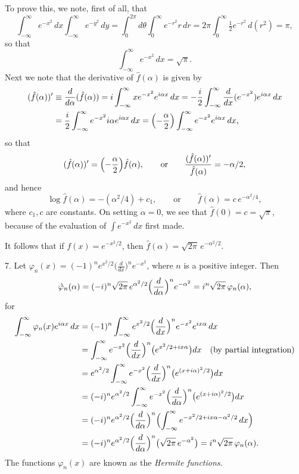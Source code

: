 To prove this, we note, first of all, that
\begin{equation*}
\int_{-\infty}^{\infty}e^{-x^2}\,dx\int_{-\infty}^{\infty}e^{-y^2}\,dy
=\int_0^{2\pi}d\theta\int_0^\infty e^{-r^2}r\,dr
=2\pi\int_0^\infty\tfrac12 e^{-r^2}\,d(r^2)
=\pi,
\end{equation*}
so that
\begin{equation*}
\int_{-\infty}^{\infty}e^{-x^2}\,dx=\sqrt\pi.
\end{equation*}
Next we note that the derivative of $\hat f(\alpha)$ is given by
\begin{align*}
(\hat f(\alpha))'&\equiv\frac{d}{d\alpha}(\hat f(\alpha))
=i\int_{-\infty}^{\infty}x e^{-x^2}e^{i\alpha x}\,dx
=-\frac{i}{2}\int_{-\infty}^{\infty}\frac{d}{dx}(e^{-x^2})e^{i\alpha x}\,dx\\
&=\frac{i}{2}\int_{-\infty}^{\infty}e^{-x^2}i\alpha e^{i\alpha x}\,dx
=\Bigl(-\frac{\alpha}{2}\Bigr)\int_{-\infty}^{\infty}e^{-x^2}e^{i\alpha x}\,dx,
\end{align*}
so that
\begin{equation*}
(\hat f(\alpha))'=\Bigl(-\frac{\alpha}{2}\Bigr)\hat f(\alpha),
\qquad\text{or}\qquad
\frac{(\hat f(\alpha))'}{\hat f(\alpha)}=-\alpha/2,
\end{equation*}
and hence
\begin{equation*}
\log\hat f(\alpha)=-(\alpha^2/4)+c_1,
\qquad\text{or}\qquad
\hat f(\alpha)=c\,e^{-\alpha^2/4},
\end{equation*}
where $c_1,c$ are constants. On setting $\alpha=0$, we see that $\hat f(0)=c=\sqrt\pi$, because of the evaluation of $\int e^{-x^2}\,dx$ first made.

It follows that if $f(x)=e^{-x^2/2}$, then $\hat f(\alpha)=\sqrt{2\pi}\,e^{-\alpha^2/2}$.

7. Let $\varphi_n(x)=(-1)^n e^{x^2/2}\bigl(\frac{d}{dx}\bigr)^n e^{-x^2}$, where $n$ is a positive integer. Then
\begin{equation*}
\hat\varphi_n(\alpha)=(-i)^n\sqrt{2\pi}\,e^{\alpha^2/2}\Bigl(\frac{d}{d\alpha}\Bigr)^n e^{-\alpha^2}
=i^n\sqrt{2\pi}\,\varphi_n(\alpha),
\end{equation*}
for
\begin{align*}
\int_{-\infty}^{\infty}\varphi_n(x)e^{i\alpha x}\,dx
&=(-1)^n\int_{-\infty}^{\infty}e^{x^2/2}\Bigl(\frac{d}{dx}\Bigr)^n e^{-x^2}e^{ix\alpha}\,dx\\
&=\int_{-\infty}^{\infty}e^{-x^2}\Bigl(\frac{d}{dx}\Bigr)^n\bigl(e^{x^2/2+ix\alpha}\bigr)dx
\quad\text{(by partial integration)}\\
&=e^{\alpha^2/2}\int_{-\infty}^{\infty}e^{-x^2}\Bigl(\frac{d}{dx}\Bigr)^n\bigl(e^{(x+i\alpha)^2/2}\bigr)dx\\
&=(-i)^n e^{\alpha^2/2}\int_{-\infty}^{\infty}e^{-x^2}\Bigl(\frac{d}{d\alpha}\Bigr)^n\bigl(e^{(x+i\alpha)^2/2}\bigr)dx\\
&=(-i)^n e^{\alpha^2/2}\Bigl(\frac{d}{d\alpha}\Bigr)^n
\Bigl(\int_{-\infty}^{\infty}e^{-x^2/2+ix\alpha-\alpha^2/2}\,dx\Bigr)\\
&=(-i)^n e^{\alpha^2/2}\Bigl(\frac{d}{d\alpha}\Bigr)^n\bigl(\sqrt{2\pi}\,e^{-\alpha^2}\bigr)
=i^n\sqrt{2\pi}\,\varphi_n(\alpha).
\end{align*}
The functions $\varphi_n(x)$ are known as the \emph{Hermite functions}.

